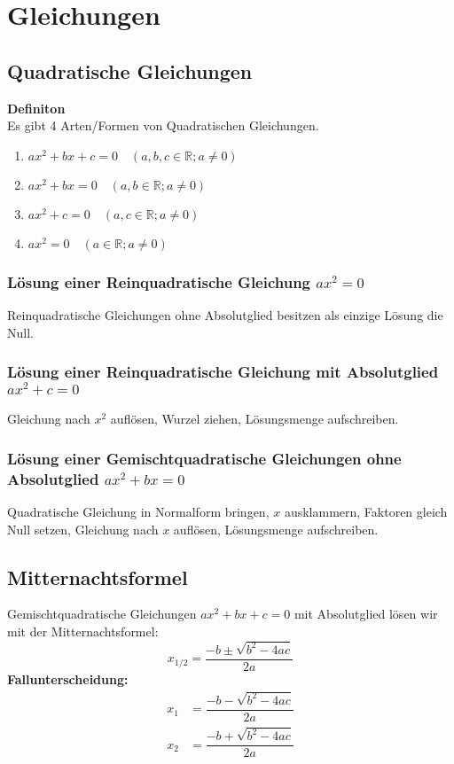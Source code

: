 

\section*{Gleichungen}

\begin{multicols*}{3}
\subsection*{Quadratische Gleichungen}
\textbf{Definiton} \\
Es gibt 4 Arten/Formen von Quadratischen Gleichungen.
\begin{enumerate}
    \item $ax^2 + bx + c = 0 \quad (a, b, c \in \mathbb{R}; a \neq 0)$
    \item $ax^2 + bx = 0 \quad (a, b \in \mathbb{R}; a \neq 0)$
    \item $ax^2 + c = 0 \quad (a, c \in \mathbb{R}; a \neq 0)$
    \item $ax^2 = 0 \quad (a \in \mathbb{R}; a \neq 0)$
\end{enumerate}
\subsubsection*{Lösung einer Reinquadratische Gleichung $ax^2 = 0$}
Reinquadratische Gleichungen ohne Absolutglied besitzen als einzige Lösung die Null.
\subsubsection*{Lösung einer Reinquadratische Gleichung mit Absolutglied $ax^2 + c = 0$}
Gleichung nach $x^2$ auflösen, Wurzel ziehen, Lösungsmenge aufschreiben.

\subsubsection*{Lösung einer Gemischtquadratische Gleichungen ohne Absolutglied $ax^2 + bx = 0$}
Quadratische Gleichung in Normalform bringen, $x$ ausklammern, Faktoren gleich Null setzen, Gleichung nach $x$ auflösen, Lösungsmenge aufschreiben.
\subsection*{Mitternachtsformel}
Gemischtquadratische Gleichungen $ax^2 + bx + c = 0$ mit Absolutglied lösen wir mit der Mitternachtsformel:
\[x_{1/2} = \frac{-b \pm \sqrt{b^2 - 4ac}}{2a}\]
\textbf{Fallunterscheidung:} \\
\begin{align*}
    x_{1} &= \dfrac{-b - \sqrt{b^2 - 4ac}}{2a} \\
    x_{2} &= \dfrac{-b + \sqrt{b^2 - 4ac}}{2a}
\end{align*}

\end{multicols*}
